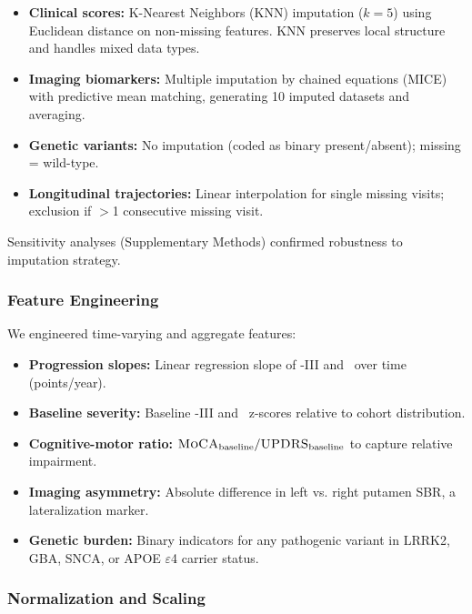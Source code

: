 \begin{itemize}
    \item \textbf{Clinical scores:} K-Nearest Neighbors (KNN) imputation ($k=5$) using Euclidean distance on non-missing features. KNN preserves local structure and handles mixed data types\cite{troyanskaya2001missing}.
    
    \item \textbf{Imaging biomarkers:} Multiple imputation by chained equations (MICE) with predictive mean matching\cite{buuren2011mice}, generating 10 imputed datasets and averaging.
    
    \item \textbf{Genetic variants:} No imputation (coded as binary present/absent); missing = wild-type.
    
    \item \textbf{Longitudinal trajectories:} Linear interpolation for single missing visits; exclusion if $>$1 consecutive missing visit.
\end{itemize}

Sensitivity analyses (Supplementary Methods) confirmed robustness to imputation strategy.

\subsubsection{Feature Engineering}

We engineered time-varying and aggregate features:

\begin{itemize}
    \item \textbf{Progression slopes:} Linear regression slope of \updrs-III and \moca\ over time (points/year).
    \item \textbf{Baseline severity:} Baseline \updrs-III and \moca\ z-scores relative to cohort distribution.
    \item \textbf{Cognitive-motor ratio:} $\textsc{MoCA}_{\text{baseline}} / \textsc{UPDRS}_{\text{baseline}}$ to capture relative impairment.
    \item \textbf{Imaging asymmetry:} Absolute difference in left vs. right putamen SBR, a lateralization marker.
    \item \textbf{Genetic burden:} Binary indicators for any pathogenic variant in LRRK2, GBA, SNCA, or APOE $\varepsilon$4 carrier status.
\end{itemize}

\subsubsection{Normalization and Scaling}

